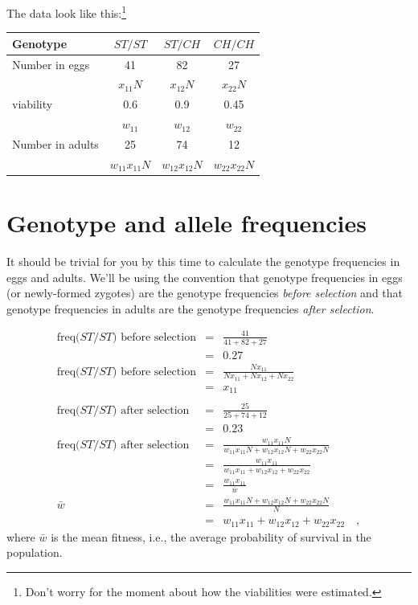 The data look like this:\footnote{Don't worry for the moment about how
the viabilities were estimated.}

\begin{center}
\begin{tabular}{l|ccc}
\hline\hline
Genotype         & $ST/ST$    & $ST/CH$    & $CH/CH$    \\
\hline
Number in eggs   & 41       & 82       & 27       \\
                 & $x_{11}N$  & $x_{12}N$  & $x_{22}N$  \\
viability        & 0.6      & 0.9      & 0.45     \\
                 & $w_{11}$   & $w_{12}$   & $w_{22}$   \\
Number in adults & 25       & 74       & 12       \\
                 & $w_{11}x_{11}N$ & $w_{12}x_{12}N$ & $w_{22}x_{22}N$ \\
\hline
\end{tabular}
\end{center}

\section*{Genotype and allele frequencies}

It should be trivial for you by this time to calculate the genotype
frequencies in eggs and adults. We'll be using the convention that
genotype frequencies in eggs (or newly-formed zygotes) are the
genotype frequencies {\it before selection\/} and that genotype
frequencies in adults are the genotype frequencies {\it after
  selection}.

\begin{eqnarray*}
\mbox{freq($ST/ST$) before selection}
 &=& \frac{41}{41 + 82 + 27} \\
 &=& 0.27 \\
\mbox{freq($ST/ST$) before selection}
 &=& \frac{Nx_{11}}{Nx_{11} + Nx_{12} + Nx_{22}} \\
 &=& x_{11} \\
 && \\
\mbox{freq($ST/ST$) after selection}
 &=& \frac{25}{25 + 74 +12} \\
 &=& 0.23 \\
\mbox{freq($ST/ST$) after selection}
 &=& \frac{w_{11}x_{11}N}{w_{11}x_{11}N + w_{12}x_{12}N + w_{22}x_{22}N} \\
 &=& \frac{w_{11}x_{11}}{w_{11}x_{11} + w_{12}x_{12} +
 w_{22}x_{22}} \\
 &=& \frac{w_{11}x_{11}}{\bar w} \\
 \bar w &=& \frac{w_{11}x_{11}N + w_{12}x_{12}N + w_{22}x_{22}N}{N} \\
        &=& w_{11}x_{11} + w_{12}x_{12} + w_{22}x_{22} \quad ,
\end{eqnarray*}
where $\bar w$ is the mean fitness, i.e., the average probability of
survival in the population.

